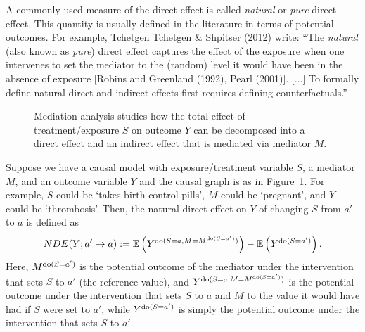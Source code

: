 A commonly used measure of the direct effect is called \emph{natural} or \emph{pure} direct effect.
This quantity is usually defined in the literature in terms of potential outcomes. 
For example, Tchetgen Tchetgen \& Shpitser (2012) write:
``The \emph{natural} (also known as \emph{pure}) direct effect captures the effect of the exposure when one 
intervenes to set the mediator to the (random) level it would have been in the absence of exposure [Robins and Greenland (1992), Pearl (2001)]. 
[...] To formally define natural direct and indirect effects first requires defining counterfactuals.''

\begin{figure}[!h]\centering
{}
\caption{\label{fig:mediation_analysis}Mediation analysis studies how the total effect
  of treatment/exposure $S$ on outcome $Y$ can be decomposed into a direct effect and 
  an indirect effect that is mediated via mediator $M$.}
\end{figure}

Suppose we have a causal model with exposure/treatment variable $S$, a mediator $M$, and an outcome variable $Y$ and the causal graph is as in Figure~\ref{fig:mediation_analysis}.
For example, $S$ could be `takes birth control pills', $M$ could be `pregnant', and $Y$ could be `thrombosis'.
Then, the natural direct effect on $Y$ of changing $S$ from $a'$ to $a$ is defined as
\begin{equation}\label{eq:nde_counterfactual}
NDE(Y; a' \to a) := \mathbb{E} \left ( Y^{\operatorname{do}(S=a,M=M^{\operatorname{do}(S=a')})} \right ) - \mathbb{E} \left ( Y^{\operatorname{do}(S=a')} \right ).
\end{equation}
Here, $M^{\operatorname{do}(S=a')}$ is the potential outcome of the mediator under the intervention that sets $S$ to $a'$ (the reference value), and $Y^{\operatorname{do}(S=a,M=M^{\operatorname{do}(S=a')})}$ is the potential outcome under the intervention that sets $S$ to $a$ and $M$ to the value it would have had if $S$ were set to $a'$, while $Y^{\operatorname{do}(S=a')}$ is simply the potential outcome under the intervention that sets $S$ to $a'$.

